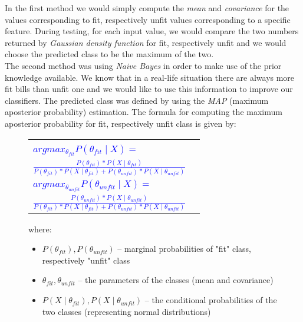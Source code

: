 \documentclass[11pt,twocolumn]{article}
\begin{document}
\hspace*{10px}In the first method we would simply compute the \emph{mean} and \emph{covariance} for the values corresponding to fit, respectively unfit values corresponding to a specific feature. During testing, for each input value, we would compare the two numbers returned by \emph{Gaussian density function} for fit, respectively unfit and we would choose the predicted class to be the maximum of the two.\\  
\hspace*{10px}The second method was using \emph{Naive Bayes} in order to make use of the prior knowledge available. We know that in a real-life situation there are always more fit bills than unfit one and we would like to use this information to improve our classifiers. The predicted class was defined by using the \emph{MAP} (maximum aposterior probability) estimation. The formula for computing the maximum aposterior probability for fit, respectively unfit class is given by:
\begin{figure}[!hbtp]
	\selectfont\small
	\begin{tabular}{|lr|} \hline
		&\\[5pt]
		\textcolor{blue}{$argmax_{\theta_{fit}}P(\theta_{fit}\mid X) = $} &\\[5pt]
		\hspace*{50px}\textcolor{blue}{$\frac{P(\theta_{fit})*P(X\mid \theta_{fit})}{P(\theta_{fit})*P(X\mid \theta_{fit}) + P(\theta_{unfit})*P(X\mid \theta_{unfit})}$} &\\[15pt]
		\textcolor{blue}{$argmax_{\theta_{unfit}}P(\theta_{unfit}\mid X) = $} &\\[5pt]
		\hspace*{50px}\textcolor{blue}{$\frac{P(\theta_{unfit})*P(X\mid \theta_{unfit})}{P(\theta_{fit})*P(X\mid \theta_{fit}) + P(\theta_{unfit})*P(X\mid \theta_{unfit})}$} &\\[10pt]
\hline
\end{tabular}
		where: 
		\begin{itemize}
		\item $P(\theta_{fit}), P(\theta_{unfit})$ -- marginal probabilities of "fit" class, respectively "unfit" class 
		\item $\theta_{fit}, \theta_{unfit}$ -- the parameters of the classes (mean and covariance) 
		\item $P(X\mid \theta_{fit}),P(X\mid \theta_{unfit})$ -- the conditional probabilities of the two classes (representing normal distributions) 
		\end{itemize} 
\end{figure}
\end{document}
